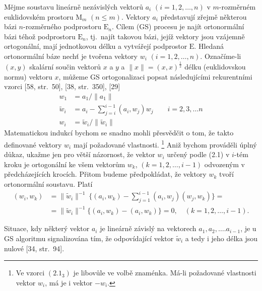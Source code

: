 Mějme soustavu lineárně nezávislých vektorů %
%
$a_i$ $(i=1,2,\ldots,n)$
%
v $m$-rozměrném euklidovském prostoru $\mathrm{M}_m$ $(n \le m)$.
Vektory $a_i$ představují zřejmě některou bázi $n$-rozměrného
podprostoru $\mathrm{E}_n$.
%
Cílem  (GS) procesu je najít ortonormální bázi
téhož podprostoru $\mathrm{E}_n$, tj.\ najít takovou bázi,
jejíž vektory jsou vzájemně ortogonální, mají jednotkovou délku
a vytvářejí podprostor $\mathrm{E}.$
Hledaná ortonormální báze nechť je tvořena vektory $w_i$
$(i=1,2,\ldots,n).$ Označíme-li $(x,y)$ skalární součin vektorů $x$ a
$y$ a $\|x\| = (x,x)^\frac{1}{2}$
délku (euklidovskou normu) vektoru $x$, můžeme GS ortogonalizaci popsat
následujícími rekurentními vzorci [58, str.\ 50], [38, str.\ 350], [29]
%
\begin{align*}
  \tag{$2.1_1$}  w_1 & =  a_1 / \| a_1 \| \\
  \tag{$2.1_2$}  \widetilde{w}_i & = a_i - \sum_{j=i}^{i-1} (a_i, w_j) w_j
                                 \qquad i = 2, 3, \ldots n\\
  \tag{$2.1_3$}  w_i & =  \widetilde{w}_i / \| \widetilde{w}_i \|
\end{align*}
%
\noindent
Matematickou indukcí bychom se snadno mohli přesvědčit o tom, že
takto definované vektory $w_i$ mají požadované vlastnosti.%
%
\footnote{Ve vzorci $(2.1_3)$ je libovůle ve volbě znaménka. Má-li
požadované vlastnosti vektor $w_i$, má je i vektor $-w_i$.} %
%
Aniž bychom prováděli úplný důkaz, ukažme jen pro větší názornost, že
vektor $w_i$ určený podle (2.1) v $i$-tém kroku je ortogonální ke
všem vektorům $w_k$, $(k=1,2,\ldots,i-1)$ odvozeným v předcházejících
krocích. Přitom budeme předpokládat, že vektory $w_k$ tvoří
ortonormální soustavu. Platí
%
%
\begin{align*}
        (w_i,w_k) &= \| \widetilde w_i \|^{-1} \
        \Big\{ (a_i,w_k) - \sum_{j=1}^{i-1} (a_i, w_j)(w_j,w_k) \Big\} = \\
        &= \|\widetilde w_i \|^{-1} \Big\{ (a_i,w_k) - (a_i,w_k)\Big\} = 0,
        \quad (k = 1,2,\ldots,i-1).                             \tag{2.2}
\end{align*}

\noindent Situace, kdy některý vektor $a_i$ je lineárně závislý na vektorech
$a_1,a_2,\ldots.a_{i-1}$, je u GS algoritmu signalizována tím, že
odpovídající vektor $\widetilde w_i$ a tedy i jeho délka jsou nulové
[34, str.\ 94].



